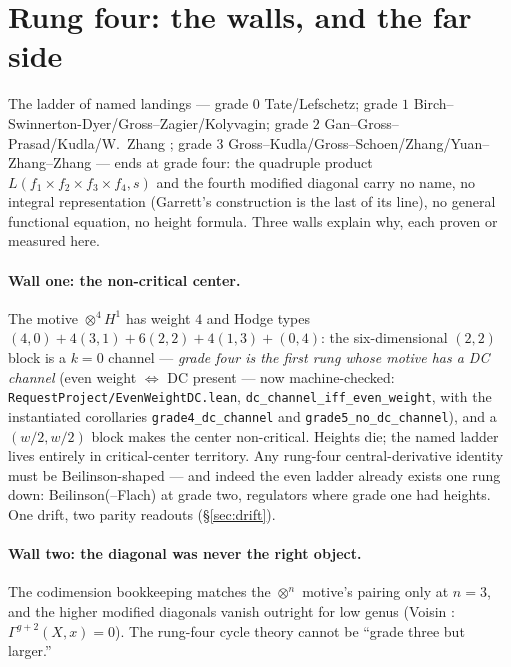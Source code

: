 \documentclass[11pt]{article}
\theoremstyle{definition}
\theoremstyle{remark}
\begin{document}
\section{Rung four: the walls, and the far side}\label{sec:rung4}

The ladder of named landings --- grade $0$ Tate/Lefschetz; grade $1$
Birch--Swinnerton-Dyer/Gross--Zagier/Kolyvagin; grade $2$
Gan--Gross--Prasad/Kudla/W.~Zhang \cite{GGP,WZhangAFL}; grade $3$
Gross--Kudla/Gross--Schoen/Zhang/Yuan--Zhang--Zhang \cite{ZhangGS,YZZ} ---
ends at grade four: the quadruple product $L(f_1\times f_2\times f_3\times
f_4,s)$ and the fourth modified diagonal carry no name, no integral
representation (Garrett's construction is the last of its line), no general
functional equation, no height formula. Three walls explain why, each proven
or measured here.

\paragraph{Wall one: the non-critical center.} The motive $\otimes^4H^1$ has
weight $4$ and Hodge types $(4,0)+4(3,1)+6(2,2)+4(1,3)+(0,4)$: the
six-dimensional $(2,2)$ block is a $k=0$ channel --- \emph{grade four is the
first rung whose motive has a DC channel} (even weight $\Leftrightarrow$ DC
present --- now machine-checked:
\texttt{RequestProject/EvenWeightDC.lean},
\texttt{dc\_channel\_iff\_even\_weight}, with the instantiated corollaries
\texttt{grade4\_dc\_channel} and \texttt{grade5\_no\_dc\_channel}), and a
$(w/2,w/2)$ block makes the center non-critical. Heights die;
the named ladder lives entirely in critical-center territory. Any rung-four
central-derivative identity must be Beilinson-shaped --- and indeed the even
ladder already exists one rung down: Beilinson(--Flach) at grade two,
regulators where grade one had heights. One drift, two parity readouts
(\S\ref{sec:drift}).

\paragraph{Wall two: the diagonal was never the right object.} The
codimension bookkeeping matches the $\otimes^n$ motive's pairing only at
$n=3$, and the higher modified diagonals vanish outright for low genus
(Voisin \cite{VoisinMD}: $\Gamma^{g+2}(X,x)=0$). The rung-four cycle theory cannot be ``grade
three but larger.''
\end{document}
